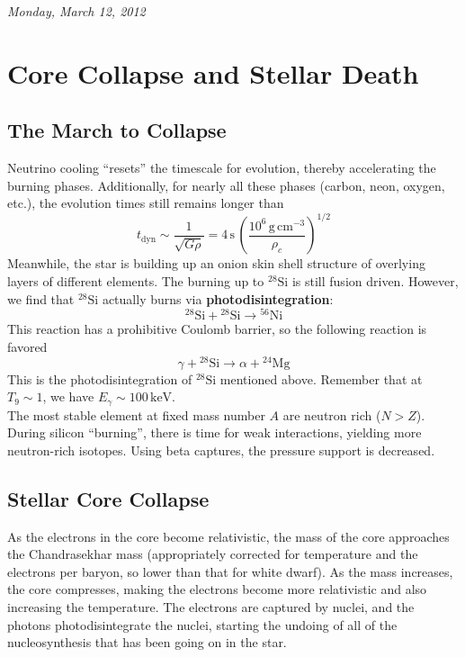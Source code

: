 \documentclass[10pt]{article}
\numberwithin{equation}{section}
\newcommand{\n}{\noindent}
\begin{document}
    \n \textit{Monday, March 12, 2012}    
\section{Core Collapse and Stellar Death}
	\label{sec:core-collapse} 
	\subsection{The March to Collapse}
	\label{sec:march-to-collapse}
	Neutrino cooling ``resets'' the timescale for evolution, thereby 
accelerating the burning phases. Additionally, for nearly all these phases 
(carbon, neon, oxygen, etc.), the evolution times still remains longer than
	\begin{equation}
	\label{eq:364} t_{\mathrm{dyn}}\sim\frac{1}{\sqrt{G\rho}}=4\,\mathrm{s}
\,\left(\frac{10^{6}\,\mathrm{g\,cm^{-3}}}{\rho_{c}}\right)^{1/2}
	\end{equation}
	Meanwhile, the star is building up an onion skin shell structure of 
        overlying layers of different elements. The burning up to ${}^{28}\mathrm
        {Si}$ is still fusion driven. However, we find that ${}^{28}\mathrm{Si}$ actually burns via 
        \textbf{photodisintegration}:
	\begin{equation}
          \label{eq:365}{}^{28}\mathrm{Si}+{}^{28}\mathrm{Si}\to{}^{56}\mathrm
          {Ni}
	\end{equation}
	This reaction has a prohibitive Coulomb barrier, so the following 
        reaction is favored
	\begin{equation}
          \label{eq:366} \gamma+{}^{28}\mathrm{Si}\to\alpha+{}^{24}\mathrm{Mg}
	\end{equation}
	This is the photodisintegration of $\mathrm{{}^{28}Si}$
        mentioned above. Remember that at $T_{9}\sim 1$, we have
        $E_{\gamma}\sim 100\,\mathrm{keV}$.\\
	
	\n The most stable element at fixed mass number $A$ are neutron rich 
        ($N>Z$). During silicon ``burning'', there is time for weak interactions, 
        yielding more neutron-rich isotopes. Using beta captures, the pressure 
        support is decreased.
	\subsection{Stellar Core Collapse}
	As the electrons in the core become relativistic, the mass of the core 
        approaches the Chandrasekhar mass (appropriately corrected for temperature 
        and the electrons per baryon, so lower than that for white dwarf). As the 
        mass increases, the core compresses, making the electrons become more 
        relativistic and also increasing the temperature. The electrons are 
        captured by nuclei, and the photons photodisintegrate the nuclei, starting 
        the undoing of all of the nucleosynthesis that has been going on in
        the star.\\ 
\end{document}

